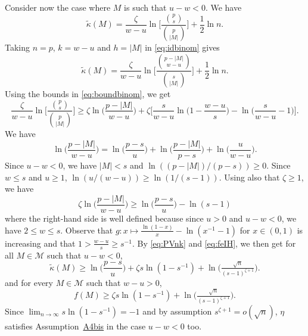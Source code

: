 \documentclass[
  12pt]{article}
\newcommand{\M}{\mathcal{M}}
\begin{document}
Consider now the case where $M$ is such that $u-w<0$. We have
     \begin{equation*}
        \tilde{\kappa}(M)=\frac{\zeta}{w-u}\ln\Bigg[\frac{\binom{p}{s}}{\binom{p}{|M|}}\Bigg]+ \frac{1}{2}\ln n.
    \end{equation*}
 Taking $n=p$, $k=w-u$ and $h=|M|$ in \eqref{eq:idbinom} gives
     \begin{equation}\label{eq:identitybinom2}
     \tilde{\kappa}(M)=\frac{\zeta}{w-u}\ln\Bigg[\frac{\binom{p - |M|}{w-u}}{\binom{s}{|M|}}\Bigg]+ \frac{1}{2}\ln n.
    \end{equation}
Using the bounds in \eqref{eq:boundbinom}, we get
\begin{equation}\label{eq:PVnk}
    \frac{\zeta}{w-u}\ln\bigg[\frac{\binom{p}{s}}{\binom{p}{|M|}}\bigg] \geq \zeta\ln\bigg(\frac{p-|M|}{w-u}\bigg)+\zeta\bigg[\frac{s}{w-u}\ln\bigg(1-\frac{w-u}{s}\bigg) -\ln\bigg(\frac{s}{w-u}-1\bigg) \bigg].
\end{equation}
We have
$$\ln\bigg(\frac{p-|M|}{w-u}\bigg)=\ln\bigg(\frac{p-s}{u}\bigg)+\ln\bigg(\frac{p-|M|}{p-s}\bigg)+\ln\bigg(\frac{u}{w-u}\bigg).$$
Since $u-w<0$, we have $|M|<s$ and $\ln((p-|M|)/(p-s))\geq 0$. Since $w\leq s$ and $u\geq 1$, $\ln(u/(w-u))\geq\ln(1/(s-1))$. Using also that $\zeta\geq 1$, we have
\begin{equation}\label{eq:feIH}
    \zeta\ln\bigg(\frac{p-|M|}{w-u}\bigg) \geq \ln\bigg(\frac{p-s}{u}\bigg) - \ln(s-1)
\end{equation}
where the right-hand side is well defined because since $u>0$ and $u-w<0$, we have $2\leq w\leq s$. Observe that $g:x \mapsto \frac{\ln(1-x)}{x}-\ln({x}^{-1}-1)$ for $x\in(0,1)$ is increasing and that $1>\frac{w-u}{s} \geq s^{-1}$. By \eqref{eq:PVnk} and \eqref{eq:feIH}, we then get for all $M\in \M$ such that $u-w<0$, 
\begin{equation*}
        \tilde{\kappa}(M) \geq \ln\big(\frac{p-s}{u}\big)+\zeta s\ln(1-s^{-1})+ \ln \big(\tfrac{\sqrt{n}}{(s-1)^{\zeta+1}}\big).
\end{equation*}
and for every $M\in\mathcal{M}$ such that $w-u>0$,
\begin{equation}\label{eq:bounbkappaebicunderfit}
        f(M) \geq \zeta s\ln(1-s^{-1})+ \ln \big(\tfrac{\sqrt{n}}{(s-1)^{\zeta+1}}\big).
\end{equation}
Since $\lim_{n\to\infty}s\ln(1-s^{-1})=-1$ and by assumption $s^{\zeta+1}=o(\sqrt{n})$, $\eta$ satisfies Assumption~\hyperlink{lab:A4bis}{A4bis} in the case $u-w<0$ too.
\end{document}

